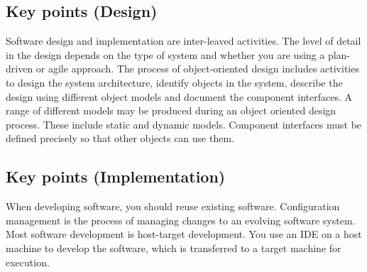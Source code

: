 \documentclass[../ESOF_notes.tex]{subfiles}
\begin{document}
\subsection{Key points (Design)}
Software design and implementation are inter-leaved activities. The level of detail in the design depends on the type of system and whether you are using a plan-driven or agile approach.
\newline
The process of object-oriented design includes activities to design the system architecture, identify objects in the system, describe the design using different object models and document the component interfaces.
\newline
A range of different models may be produced during an object oriented design process. These include static and dynamic models.
\newline
Component interfaces must be defined precisely so that other objects can use them.

\subsection{Key points (Implementation)}
When developing software, you should reuse existing software.
\newline
Configuration management is the process of managing changes to an evolving software system.
\newline
Most software development is host-target development. You use an IDE on a host machine to develop the software, which is transferred to a target machine for execution.
\end{document}
